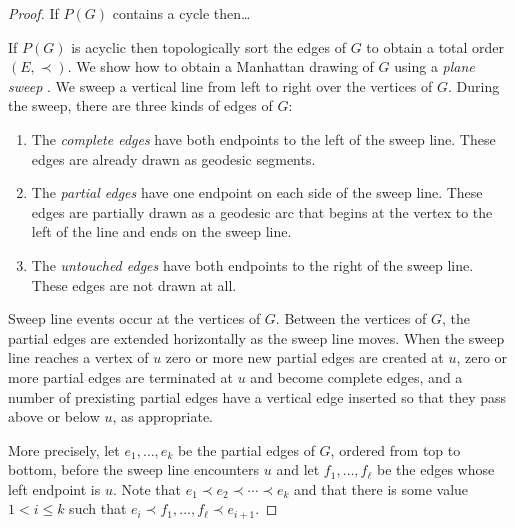 \documentclass[lotsofwhite]{patmorin}
\begin{document}
\begin{proof}
If $P(G)$ contains a cycle then\ldots

If $P(G)$ is acyclic then topologically sort the edges of $G$ to
obtain a total order $(E,\prec)$. We show how to obtain a Manhattan
drawing of $G$ using a \emph{plane sweep} \cite{boXX}.  We sweep a
vertical line from left to right over the vertices of $G$.  During the
sweep, there are three kinds of edges of $G$:
\begin{enumerate}
\item The \emph{complete edges} have both endpoints to the left of
the sweep line.  These edges are already drawn as geodesic segments.

\item The \emph{partial edges} have one endpoint on each side of the
sweep line.  These edges are partially drawn as a geodesic arc that
begins at the vertex to the left of the line and ends on the sweep
line.

\item The \emph{untouched edges} have both endpoints to the right of
the sweep line.  These edges are not drawn at all.
\end{enumerate}

Sweep line events occur at the vertices of $G$.  Between the vertices
of $G$, the partial edges are extended horizontally as the sweep line
moves.  When the sweep line reaches a vertex of $u$ zero or more new
partial edges are created at $u$, zero or more partial edges are
terminated at $u$ and become complete edges, and a number of
prexisting partial edges have a vertical edge inserted so that they
pass above or below $u$, as appropriate. 

More precisely, let $e_1,\ldots,e_k$ be the partial edges of $G$,
ordered from top to bottom, before the sweep line encounters $u$ and
let $f_1,\ldots,f_\ell$ be the edges whose left endpoint is $u$.  Note
that $e_1\prec e_2\prec\cdots\prec e_k$ and that there is some value
$1<i\le k$ such that $e_i\prec f_1,\ldots,f_\ell\prec e_{i+1}$.  

\end{proof}
\end{document}
